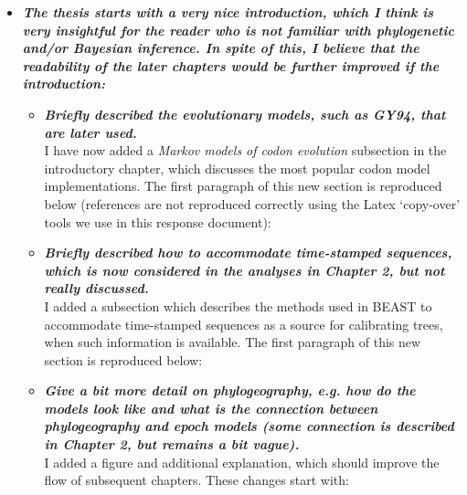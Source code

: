 \documentclass[english]{article}
\begin{document}
\begin{itemize}

\item {
{\it
\textbf{
The thesis starts with a very nice introduction, which I think is very insightful for the reader who is not familiar with phylogenetic and/or Bayesian inference. 
In spite of this, I believe that the readability of the later chapters would be further improved if the introduction:
}%
}%
}%

\begin{itemize}

\item {
{\it
\textbf{
Briefly described the evolutionary models, such as GY94, that are later used.
}%
}%
}%
\\
I have now added a \emph{Markov models of codon evolution} subsection in the introductory chapter, which discusses the most popular codon model implementations. The first paragraph of this new section is reproduced below (references are not reproduced correctly using the Latex `copy-over' tools we use in this response document):

\begin{quote}
\myeditsvonea
\end{quote}

\item {
{\it
\textbf{
Briefly described how to accommodate time-stamped sequences, which is now considered in the analyses in Chapter 2, but not really discussed.
}%
}%
}%
\\
%
%
I added a subsection which describes the methods used in BEAST to accommodate time-stamped sequences as a source for calibrating trees, when such information is available. The first paragraph of this new section is reproduced below:

\begin{quote}
\myeditsvoneb
\end{quote}

\item {
{\it
\textbf{
Give a bit more detail on phylogeography, e.g. how do the models look like and what is the connection between phylogeography and epoch models (some connection is described in Chapter 2, but remains a bit vague).
}%
}%
}%
\\
I added a figure and additional explanation, which should improve the flow of subsequent chapters. 
These changes start with:


\end{itemize}
\end{itemize}
\end{document}

